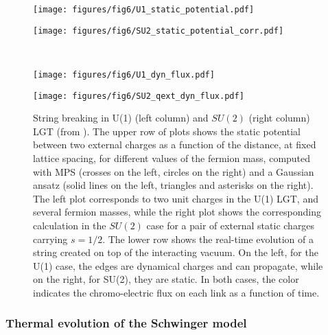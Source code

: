 \documentclass[epj,final]{svjour}
\begin{document}
\begin{figure}
\begin{minipage}[c]{.45\columnwidth}
\texttt{[image: figures/fig6/U1\_static\_potential.pdf]}
\end{minipage}
\begin{minipage}[c]{.45\columnwidth} 
\texttt{[image: figures/fig6/SU2\_static\_potential\_corr.pdf]}
\end{minipage}\\
\begin{minipage}[c]{.45\columnwidth}
\texttt{[image: figures/fig6/U1\_dyn\_flux.pdf]}
\end{minipage}
\begin{minipage}[c]{.45\columnwidth} 
\hfill
\texttt{[image: figures/fig6/SU2\_qext\_dyn\_flux.pdf]}
\end{minipage}
\caption{ String breaking in U(1) (left column) and $SU(2)$ (right column) LGT (from \cite{sala2018pos}). The upper row of plots shows the static potential between two external charges as a function of the distance, at fixed lattice spacing, for different values of the fermion mass, computed with MPS (crosses on the left, circles on the right) and a Gaussian ansatz (solid lines on the left, triangles and asterisks on the right). The left plot corresponds to two unit charges in the U(1) LGT, and several fermion masses, while the right plot shows the corresponding calculation in the $SU(2)$ case for a pair of external static charges carrying $s=1/2$. The lower row shows the real-time evolution of a string created on top of the interacting vacuum. On the left, for the U(1) case, the edges are dynamical charges and can propagate, while on the right, for SU(2), they are static. In both cases, the color indicates the chromo-electric flux on each link as a function of time.}
\label{fig:gaussian}
\end{figure}

\subsubsection{Thermal evolution of the Schwinger model \cite{banuls2016thermalmass,Banuls2015}}
\end{document}
